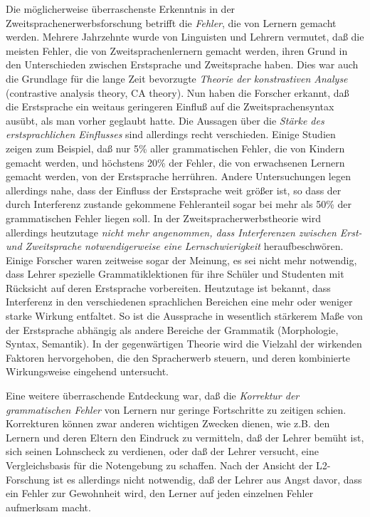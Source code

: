 \documentclass[
  letterpaper,
]{scrbook}
\begin{document}
Die möglicherweise überraschenste Erkenntnis in der
Zweitsprachenerwerbsforschung betrifft die \emph{Fehler}, die von
Lernern gemacht werden. Mehrere Jahrzehnte wurde von Linguisten und
Lehrern vermutet, daß die meisten Fehler, die von Zweitsprachenlernern
gemacht werden, ihren Grund in den Unterschieden zwischen Erstsprache
und Zweitsprache haben. Dies war auch die Grundlage für die lange Zeit
bevorzugte \emph{Theorie der konstrastiven Analyse} (contrastive
analysis theory, CA theory). Nun haben die Forscher erkannt, daß die
Erstsprache ein weitaus geringeren Einfluß auf die Zweitsprachensyntax
ausübt, als man vorher geglaubt hatte. Die Aussagen über die
\emph{Stärke des erstsprachlichen Einflusses} sind allerdings recht
verschieden. Einige Studien zeigen zum Beispiel, daß nur 5\% aller
grammatischen Fehler, die von Kindern gemacht werden, und höchstens 20\%
der Fehler, die von erwachsenen Lernern gemacht werden, von der
Erstsprache herrühren. Andere Untersuchungen legen allerdings nahe, dass
der Einfluss der Erstsprache weit größer ist, so dass der durch
Interferenz zustande gekommene Fehleranteil sogar bei mehr als 50\% der
grammatischen Fehler liegen soll. In der Zweitspracherwerbstheorie wird
allerdings heutzutage \emph{nicht mehr angenommen, dass Interferenzen
zwischen Erst- und Zweitsprache notwendigerweise eine Lernschwierigkeit}
heraufbeschwören. Einige Forscher waren zeitweise sogar der Meinung, es
sei nicht mehr notwendig, dass Lehrer spezielle Grammatiklektionen für
ihre Schüler und Studenten mit Rücksicht auf deren Erstsprache
vorbereiten. Heutzutage ist bekannt, dass Interferenz in den
verschiedenen sprachlichen Bereichen eine mehr oder weniger starke
Wirkung entfaltet. So ist die Aussprache in wesentlich stärkerem Maße
von der Erstsprache abhängig als andere Bereiche der Grammatik
(Morphologie, Syntax, Semantik). In der gegenwärtigen Theorie wird die
Vielzahl der wirkenden Faktoren hervorgehoben, die den Spracherwerb
steuern, und deren kombinierte Wirkungsweise eingehend untersucht.

Eine weitere überraschende Entdeckung war, daß die \emph{Korrektur der
grammatischen Fehler} von Lernern nur geringe Fortschritte zu zeitigen
schien. Korrekturen können zwar anderen wichtigen Zwecken dienen, wie
z.B. den Lernern und deren Eltern den Eindruck zu vermitteln, daß der
Lehrer bemüht ist, sich seinen Lohnscheck zu verdienen, oder daß der
Lehrer versucht, eine Vergleichsbasis für die Notengebung zu schaffen.
Nach der Ansicht der L2-Forschung ist es allerdings nicht notwendig, daß
der Lehrer aus Angst davor, dass ein Fehler zur Gewohnheit wird, den
Lerner auf jeden einzelnen Fehler aufmerksam macht.
\end{document}
